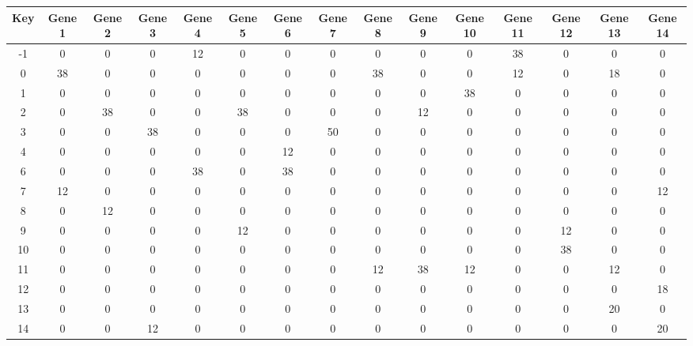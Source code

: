 \begin{tabular}{|c|c|c|c|c|c|c|c|c|c|c|c|c|c|c|}
\hline
Key & Gene 1 & Gene 2 & Gene 3 & Gene 4 & Gene 5 & Gene 6 & Gene 7 & Gene 8 & Gene 9 & Gene 10 & Gene 11 & Gene 12 & Gene 13 & Gene 14 \\
\hline
-1 & 0 & 0 & 0 & 12 & 0 & 0 & 0 & 0 & 0 & 0 & 38 & 0 & 0 & 0 \\
0 & 38 & 0 & 0 & 0 & 0 & 0 & 0 & 38 & 0 & 0 & 12 & 0 & 18 & 0 \\
1 & 0 & 0 & 0 & 0 & 0 & 0 & 0 & 0 & 0 & 38 & 0 & 0 & 0 & 0 \\
2 & 0 & 38 & 0 & 0 & 38 & 0 & 0 & 0 & 12 & 0 & 0 & 0 & 0 & 0 \\
3 & 0 & 0 & 38 & 0 & 0 & 0 & 50 & 0 & 0 & 0 & 0 & 0 & 0 & 0 \\
4 & 0 & 0 & 0 & 0 & 0 & 12 & 0 & 0 & 0 & 0 & 0 & 0 & 0 & 0 \\
6 & 0 & 0 & 0 & 38 & 0 & 38 & 0 & 0 & 0 & 0 & 0 & 0 & 0 & 0 \\
7 & 12 & 0 & 0 & 0 & 0 & 0 & 0 & 0 & 0 & 0 & 0 & 0 & 0 & 12 \\
8 & 0 & 12 & 0 & 0 & 0 & 0 & 0 & 0 & 0 & 0 & 0 & 0 & 0 & 0 \\
9 & 0 & 0 & 0 & 0 & 12 & 0 & 0 & 0 & 0 & 0 & 0 & 12 & 0 & 0 \\
10 & 0 & 0 & 0 & 0 & 0 & 0 & 0 & 0 & 0 & 0 & 0 & 38 & 0 & 0 \\
11 & 0 & 0 & 0 & 0 & 0 & 0 & 0 & 12 & 38 & 12 & 0 & 0 & 12 & 0 \\
12 & 0 & 0 & 0 & 0 & 0 & 0 & 0 & 0 & 0 & 0 & 0 & 0 & 0 & 18 \\
13 & 0 & 0 & 0 & 0 & 0 & 0 & 0 & 0 & 0 & 0 & 0 & 0 & 20 & 0 \\
14 & 0 & 0 & 12 & 0 & 0 & 0 & 0 & 0 & 0 & 0 & 0 & 0 & 0 & 20 \\
\hline
\end{tabular}